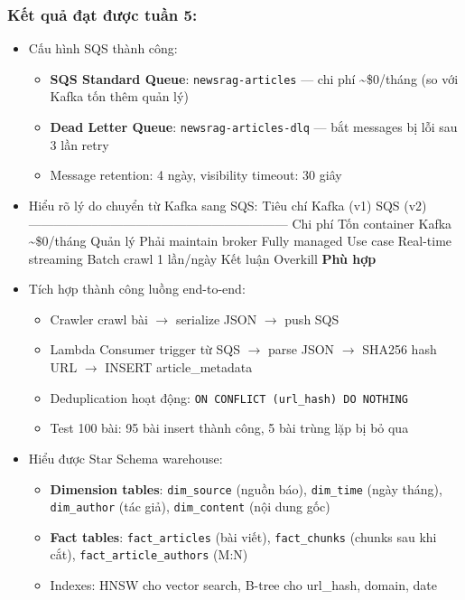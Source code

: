 \hypertarget{kux1ebft-quux1ea3-ux111ux1ea1t-ux111ux1b0ux1ee3c-tuux1ea7n-5}{%
\subsubsection{Kết quả đạt được tuần
5:}}

\begin{itemize}
\item
  Cấu hình SQS thành công:

  \begin{itemize}
  \tightlist
  \item
    \textbf{SQS Standard Queue}: \texttt{newsrag-articles} --- chi phí
    \textasciitilde\$0/tháng (so với Kafka tốn thêm quản lý)
  \item
    \textbf{Dead Letter Queue}: \texttt{newsrag-articles-dlq} --- bắt
    messages bị lỗi sau 3 lần retry
  \item
    Message retention: 4 ngày, visibility timeout: 30 giây
  \end{itemize}
\item
  Hiểu rõ lý do chuyển từ Kafka sang SQS: \textbar{} Tiêu chí \textbar{}
  Kafka (v1) \textbar{} SQS (v2) \textbar{}
  \textbar-----------------\textbar---------------------\textbar------------------------\textbar{}
  \textbar{} Chi phí \textbar{} Tốn container Kafka \textbar{}
  \textasciitilde\$0/tháng \textbar{} \textbar{} Quản lý \textbar{} Phải
  maintain broker \textbar{} Fully managed \textbar{} \textbar{} Use
  case \textbar{} Real-time streaming \textbar{} Batch crawl 1 lần/ngày
  \textbar{} \textbar{} Kết luận \textbar{} Overkill \textbar{}
  \textbf{Phù hợp} \textbar{}
\item
  Tích hợp thành công luồng end-to-end:

  \begin{itemize}
  \tightlist
  \item
    Crawler crawl bài \(\rightarrow\) serialize JSON \(\rightarrow\)
    push SQS
  \item
    Lambda Consumer trigger từ SQS \(\rightarrow\) parse JSON
    \(\rightarrow\) SHA256 hash URL \(\rightarrow\) INSERT
    article\_metadata
  \item
    Deduplication hoạt động:
    \texttt{ON\ CONFLICT\ (url\_hash)\ DO\ NOTHING}
  \item
    Test 100 bài: 95 bài insert thành công, 5 bài trùng lặp bị bỏ qua
  \end{itemize}
\item
  Hiểu được Star Schema warehouse:

  \begin{itemize}
  \tightlist
  \item
    \textbf{Dimension tables}: \texttt{dim\_source} (nguồn báo),
    \texttt{dim\_time} (ngày tháng), \texttt{dim\_author} (tác giả),
    \texttt{dim\_content} (nội dung gốc)
  \item
    \textbf{Fact tables}: \texttt{fact\_articles} (bài viết),
    \texttt{fact\_chunks} (chunks sau khi cắt),
    \texttt{fact\_article\_authors} (M:N)
  \item
    Indexes: HNSW cho vector search, B-tree cho url\_hash, domain, date
  \end{itemize}
\end{itemize}
